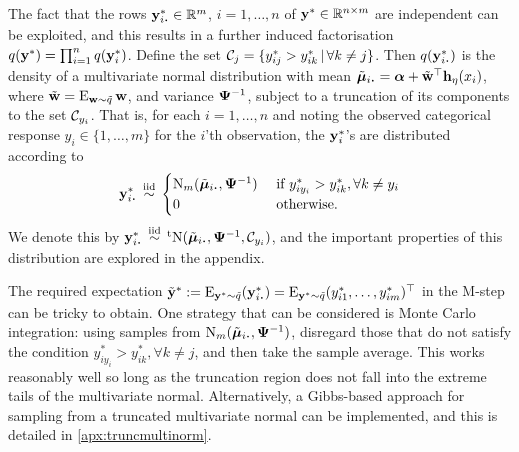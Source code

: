 The fact that the rows $\by_{i \bigcdot}^* \in \bbR^m$, $i=1,\dots,n$ of ${\mathbf y}^* \in \mathbb{R}^{n \times m}$ are independent can be exploited, and this results in a further induced factorisation $q({\mathbf y}^*) = \prod_{i=1}^n q({\mathbf y}_i^*)$.
Define the set ${\mathcal C}_j = \{y_{ij}^* > y_{ik}^* \,|\, \forall k\neq j \}$.
Then $q(\by_{i \bigcdot}^*)$ is the density of a multivariate normal distribution with mean $\tilde \bmu_{i \bigcdot} = \balpha + \tilde\bw^\top  \bh_\eta(x_i)$, where $\tilde {{\mathbf w}} = \operatorname{E}_{{\mathbf w}\sim\tilde q}{\mathbf w}$, and variance ${\bm\Psi}^{-1}$, subject to a truncation of its components to the set ${\mathcal C}_{y_i}$.
That is, for each $i=1,\dots,n$ and noting the observed categorical response $y_i \in \{1,\dots,m\}$ for the $i$'th observation, the ${\mathbf y}_i^*$'s are distributed according to
\begin{align}\label{eq:ystardist}
  \by_{i \bigcdot}^* \iid
  \begin{cases}
    \N_m(\tilde\bmu_{i \bigcdot},  \bPsi^{-1}) & \text{ if } y_{iy_i}^* > y_{ik}^*, \forall k \neq y_i \\
    0 & \text{ otherwise}. \\
  \end{cases}
\end{align}
We denote this by $\by_{i \bigcdot}^* \iid \tN(\tilde\bmu_{i \bigcdot}, \bPsi^{-1},\cC_{y_i})$, and the important properties of this distribution are explored in the appendix.

The required expectation $\tilde\by^* := \E_{\by^*\sim\tilde q} (\by^*_{i\bigcdot}) = \E_{\by^*\sim\tilde q} (y_{i1}^*,\dots, y_{im}^*)^\top$ in the M-step can be tricky to obtain.
One strategy that can be considered is Monte Carlo integration: using samples from $\N_m(\tilde\bmu_{i \bigcdot},  \bPsi^{-1})$, disregard those that do not satisfy the condition $y_{iy_i}^* > y_{ik}^*, \forall k \neq j$, and then take the sample average.
This works reasonably well so long as the truncation region does not fall into the extreme tails of the multivariate normal.
Alternatively, a Gibbs-based approach \citep{robert1995simulation} for sampling from a truncated multivariate normal can be implemented, and this is detailed in \cref{apx:truncmultinorm}.

